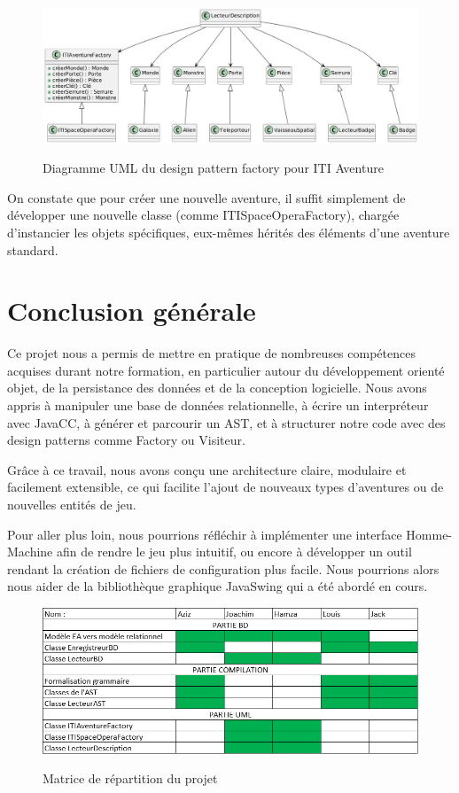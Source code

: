 \documentclass[a4paper, 12pt]{report}
\begin{document}
\begin{figure}[h]
	\centering
	\includegraphics[width=1\textwidth]{DP.png}\\[1.0 cm]
	\caption{Diagramme UML du design pattern factory pour ITI Aventure}
\end{figure}
On constate que pour créer une nouvelle aventure, il suffit simplement de développer une nouvelle classe (comme ITISpaceOperaFactory), chargée d’instancier les objets spécifiques, eux-mêmes hérités des éléments d’une aventure standard.

\chapter*{Conclusion générale}

Ce projet nous a permis de mettre en pratique de nombreuses compétences acquises durant notre formation, en particulier autour du développement orienté objet, de la persistance des données et de la conception logicielle. 
Nous avons appris à manipuler une base de données relationnelle, à écrire un interpréteur avec JavaCC, à générer et parcourir un AST, et à structurer notre code avec des design patterns comme Factory ou Visiteur.

Grâce à ce travail, nous avons conçu une architecture claire, modulaire et facilement extensible, ce qui facilite l'ajout de nouveaux types d'aventures ou de nouvelles entités de jeu.

Pour aller plus loin, nous pourrions réfléchir à implémenter une interface Homme-Machine afin de rendre le jeu plus intuitif, ou encore à développer un outil rendant la création de fichiers de configuration plus facile.
Nous pourrions alors nous aider de la bibliothèque graphique JavaSwing qui a été abordé en cours.

\bigbreak
\begin{figure}[htbp]
	\centering
	\includegraphics[width=1\textwidth]{matrice_repartition.png}\\[1.0 cm]
	\caption{Matrice de répartition du projet}
\end{figure}
\end{document}
